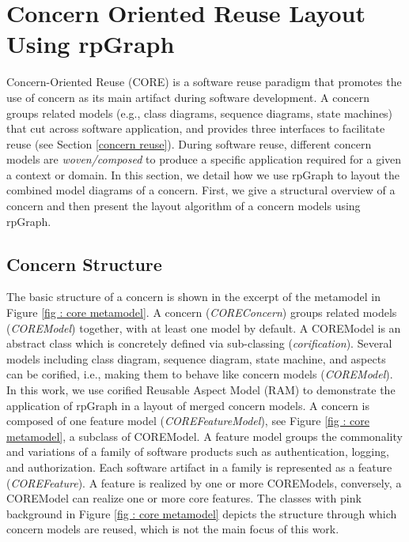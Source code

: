 \section{Concern Oriented Reuse Layout Using rpGraph} \label{core}
Concern-Oriented Reuse (CORE) is a software reuse paradigm that promotes the use of concern as its main artifact during software development. A concern groups related models (e.g., class diagrams, sequence diagrams, state machines) that cut across software application, and provides three interfaces to facilitate reuse (see Section \ref{concern reuse}). During software reuse, different concern models are \textit{woven/composed} to produce a specific application required for a given a context or domain. In this section, we detail how we use rpGraph to layout the combined model diagrams of a concern. First, we give a structural overview of a concern and then present the layout algorithm of a concern models using rpGraph.

\subsection{Concern Structure}
The basic structure of a concern is shown in the excerpt of the metamodel in Figure \ref{fig : core metamodel}. A concern (\textit{COREConcern}) groups related models (\textit{COREModel}) together, with at least one model by default. A COREModel is an abstract class which is concretely defined via sub-classing (\textit{corification}). Several models including class diagram, sequence diagram, state machine, and aspects can be corified, i.e., making them to behave like concern models (\textit{COREModel}). In this work, we use corified Reusable Aspect Model (RAM) to demonstrate the application of rpGraph in a layout of merged concern models.  A concern is composed of one feature model (\textit{COREFeatureModel}), see Figure \ref{fig : core metamodel}, a subclass of COREModel. A feature model groups the commonality and variations of a family of software products such as authentication, logging, and authorization. Each software artifact in a family is represented as a feature (\textit{COREFeature}). A feature is realized by one or more COREModels, conversely, a COREModel can realize one or more core features. The classes with pink background in Figure \ref{fig : core metamodel} depicts the structure through which concern models are reused, which is not the main focus of this work.

